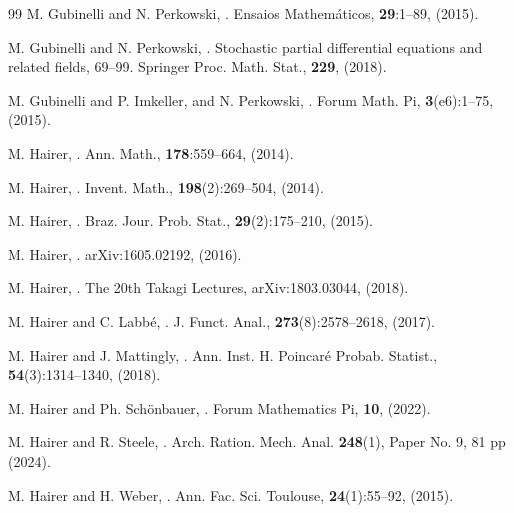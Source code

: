 \documentclass[10pt, reqno]{amsart}
\numberwithin{subsection}{section}
\numberwithin{subsubsection}{subsection}
\numberwithin{equation}{section} %
\theoremstyle{mystyle}
\theoremstyle{mystyle2}
\theoremstyle{mystyle3}
\begin{document}
\begin{thebibliography}{99}
M. Gubinelli and N. Perkowski,
.
\newblock Ensaios Mathem\'aticos, {\bf 29}:1--89, (2015).

M. Gubinelli and N. Perkowski,
.
\newblock Stochastic partial differential equations and related fields, 69--99. Springer Proc. Math. Stat., {\bf 229}, (2018).

M. Gubinelli and P. Imkeller, and N. Perkowski,
.
\newblock Forum Math. Pi, {\bf 3}(e6):1--75, (2015).

M. Hairer,
.
\newblock Ann. Math., {\bf 178}:559--664, (2014).

M. Hairer,
.
\newblock Invent. Math., {\bf 198}(2):269--504, (2014).

M. Hairer,
.
\newblock Braz. Jour. Prob. Stat., {\bf 29}(2):175--210, (2015).

M. Hairer,
.
\newblock arXiv:1605.02192, (2016).

M. Hairer,
.
\newblock The 20th Takagi Lectures, arXiv:1803.03044, (2018).

M. Hairer and C. Labb\'e,
.
\newblock J. Funct. Anal., {\bf 273}(8):2578--2618, (2017).

M. Hairer and J. Mattingly,
.
\newblock Ann. Inst. H. Poincar\'e Probab. Statist., {\bf 54}(3):1314--1340, (2018).

M. Hairer and Ph. Sch\"onbauer,
.
\newblock Forum Mathematics Pi, {\bf 10}, (2022).

M. Hairer and R. Steele,
.
\newblock Arch. Ration. Mech. Anal. {\bf 248}(1), Paper No. 9, 81 pp (2024).

M. Hairer and H. Weber,
.
\newblock Ann. Fac. Sci. Toulouse, {\bf 24}(1):55--92, (2015).


\end{thebibliography}
\end{document}
